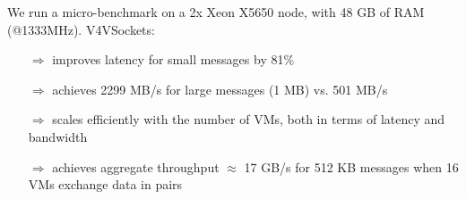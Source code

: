 \documentclass[a0paper,portrait,final]{baposter}
\newcommand{\compresslist}{%
\setlength{\itemsep}{0.1em}%
\setlength{\parskip}{0.0pt}%
\setlength{\parsep}{0.0pt}%
}
\begin{document}
\begin{poster}
{\begin{multicols}{2}
\end{multicols}
\begin{center}
\end{center}

\vspace {-1em}
We run a micro-benchmark on a 2x Xeon X5650 node, with 48 GB of RAM (@1333MHz). V4VSockets:
\begin{itemize}
\compresslist
\item[$\Rightarrow$] improves latency for small messages by 81\% 
\item[$\Rightarrow$] achieves 2299 MB/s for large messages (1 MB) vs. 501 MB/s
\item[$\Rightarrow$] scales efficiently with the number of VMs, both in terms of latency and bandwidth
\item[$\Rightarrow$] achieves aggregate throughput $\approx$ 17 GB/s for 512 KB messages when 16 VMs exchange data in pairs
\end{itemize}



}

\end{poster}
\end{document}
